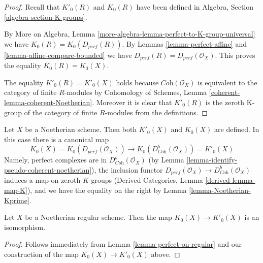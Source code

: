 \begin{proof}
Recall that $K'_0(R)$ and $K_0(R)$ have been defined in
Algebra, Section \ref{algebra-section-K-groups}.

\medskip\noindent
By More on Algebra, Lemma \ref{more-algebra-lemma-perfect-to-K-group-universal}
we have $K_0(R) = K_0(D_{perf}(R))$.
By Lemmas \ref{lemma-perfect-affine} and \ref{lemma-affine-compare-bounded}
we have $D_{perf}(R) = D_{perf}(\mathcal{O}_X)$.
This proves the equality $K_0(R) = K_0(X)$.

\medskip\noindent
The equality $K'_0(R) = K'_0(X)$ holds because
$\textit{Coh}(\mathcal{O}_X)$ is equivalent to the category
of finite $R$-modules by Cohomology of Schemes, Lemma
\ref{coherent-lemma-coherent-Noetherian}. Moreover it is
clear that $K'_0(R)$ is the zeroth K-group of the category
of finite $R$-modules from the definitions.
\end{proof}

\noindent
Let $X$ be a Noetherian scheme. Then both $K'_0(X)$ and $K_0(X)$
are defined. In this case there is a canonical map
$$
K_0(X) = K_0(D_{perf}(\mathcal{O}_X))
\longrightarrow
K_0(D^b_{\textit{Coh}}(\mathcal{O}_X)) = K'_0(X)
$$
Namely, perfect complexes are in $D^b_{\textit{Coh}}(\mathcal{O}_X)$
(by Lemma \ref{lemma-identify-pseudo-coherent-noetherian}), the inclusion
functor
$D_{perf}(\mathcal{O}_X) \to D^b_{\textit{Coh}}(\mathcal{O}_X)$
induces a map on zeroth $K$-groups
(Derived Categories, Lemma \ref{derived-lemma-map-K}),
and we have the equality on the right by
Lemma \ref{lemma-Noetherian-Kprime}.

\begin{lemma}
\label{lemma-Kprime-K}
Let $X$ be a Noetherian regular scheme. Then
the map $K_0(X) \to K'_0(X)$ is an isomorphism.
\end{lemma}

\begin{proof}
Follows immediately from Lemma \ref{lemma-perfect-on-regular}
and our construction of the map $K_0(X) \to K'_0(X)$ above.
\end{proof}

